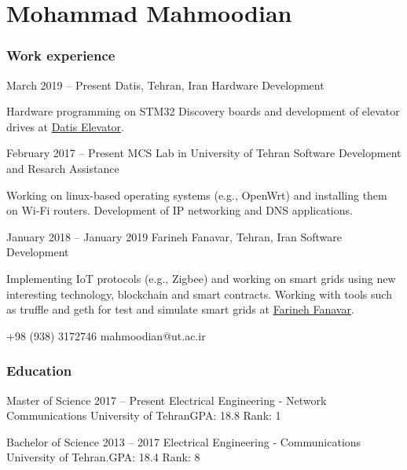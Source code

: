 \documentclass{tccv}
\begin{document}
\part{Mohammad Mahmoodian}

\section{Work experience}

\begin{eventlist}

\item{March 2019 -- Present}
     {Datis, Tehran, Iran}
     {Hardware Development}

Hardware programming on STM32 Discovery boards and development of elevator
drives at \href{www.datis-elevator.ir}{Datis Elevator}.


\item{February 2017 -- Present}
     {MCS Lab in University of Tehran}
     {Software Development and Resarch Assistance}

Working on linux-based operating systems (e.g., OpenWrt) and installing them on Wi-Fi routers.
Development of IP networking and DNS applications.

\item{January 2018 -- January 2019}
     {Farineh Fanavar, Tehran, Iran}
     {Software Development}

Implementing IoT protocols (e.g., Zigbee) and working on smart grids using
new interesting technology, blockchain and smart contracts. Working with tools
such as truffle and geth for test and simulate smart grids
at \href{http://farinehtech.com/}{Farineh Fanavar}.

\end{eventlist}

    {+98 (938) 3172746}
    {mahmoodian@ut.ac.ir}

\section{Education}

\begin{yearlist}
\item[Master of Science]{2017 -- Present}
     {Electrical Engineering - Network Communications}
     {University of Tehran\newline GPA: 18.8 \newline Rank: 1}

\item[Bachelor of Science]{2013 -- 2017}
     {Electrical Engineering - Communications}
     {University of Tehran.\newline GPA: 18.4 \newline Rank: 8}
\end{yearlist}
\end{document}

